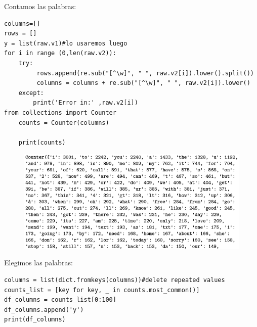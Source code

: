 \documentclass[a4paper,11pt]{article}
\begin{document}
\noindent
Contamos las palabras:
\begin{lstlisting}
columns=[] 
rows = [] 
y = list(raw.v1)#lo usaremos luego 
for i in range (0,len(raw.v2)): 
    try:
         rows.append(re.sub("[^\w]", " ", raw.v2[i]).lower().split()) 
         columns = columns + re.sub("[^\w]", " ", raw.v2[i]).lower()
    except: 
        print('Error in:' ,raw.v2[i])
from collections import Counter 
    counts = Counter(columns)

    print(counts)
\end{lstlisting}
\begin{figure}[H]
\centering
\includegraphics[scale=0.83]{Annotation 2020-03-23 182424.png}
\end{figure}
Elegimos las palabras:
\begin{lstlisting}
columns = list(dict.fromkeys(columns))#delete repeated values 
counts_list = [key for key, _ in counts.most_common()] 
df_columns = counts_list[0:100] 
df_columns.append('y') 
print(df_columns)
\end{lstlisting}
\end{document}

